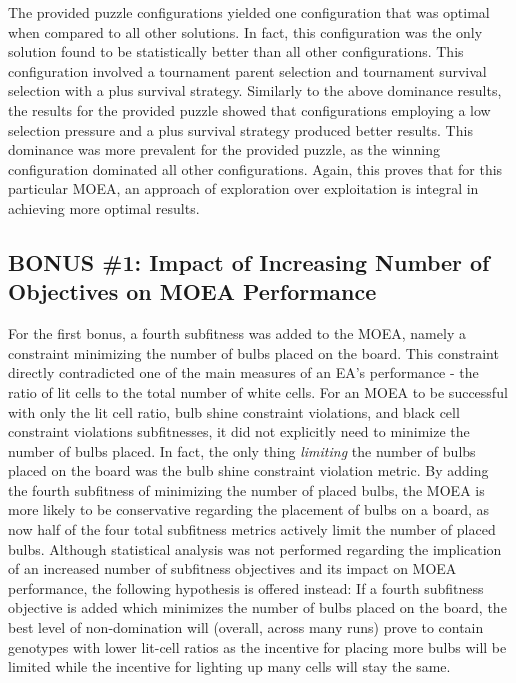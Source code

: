 \documentclass[11pt]{article}
\begin{document}
The provided puzzle configurations yielded one configuration that was optimal when compared 
to all other solutions. In fact,
this configuration was the only solution found to be statistically better than all other 
configurations. This configuration involved
a tournament parent selection and tournament survival selection with a plus survival strategy.
Similarly to the above dominance results, the results for the provided puzzle showed that 
configurations employing a low selection pressure and a plus survival strategy produced better 
results. This dominance was more prevalent for the provided puzzle, as the winning configuration
dominated all other configurations. Again, this proves that for this particular MOEA, an approach
of exploration over exploitation is integral in achieving more optimal results.


\subsection{BONUS \#1: Impact of Increasing Number of Objectives on MOEA Performance}

For the first bonus, a fourth subfitness was added to the MOEA, namely a constraint minimizing
the number of bulbs placed on the board. This constraint directly contradicted one of the main
measures of an EA's performance - the ratio of lit cells to the total number of white cells.
For an MOEA to be successful with only the lit cell ratio, bulb shine constraint violations, and
black cell constraint violations subfitnesses, it did not explicitly need to minimize the number 
of bulbs
placed. In fact, the only thing \textit{limiting} the number of bulbs placed on the board was the
bulb shine constraint violation metric. By adding the fourth subfitness of minimizing the number
of placed bulbs, the MOEA is more likely to be conservative regarding the placement of bulbs on
a board, as now half of the four total subfitness metrics actively limit the number of placed bulbs.
Although statistical analysis was not performed regarding the implication of an increased number
of subfitness objectives and its impact on MOEA performance, the following hypothesis is offered
instead: If a fourth subfitness objective is added which minimizes the number of bulbs placed
on the board, the best level of non-domination will (overall, across many runs) prove to contain 
genotypes with lower lit-cell ratios as the incentive for placing more bulbs will be limited
while the incentive for lighting up many cells will stay the same.
\end{document}
